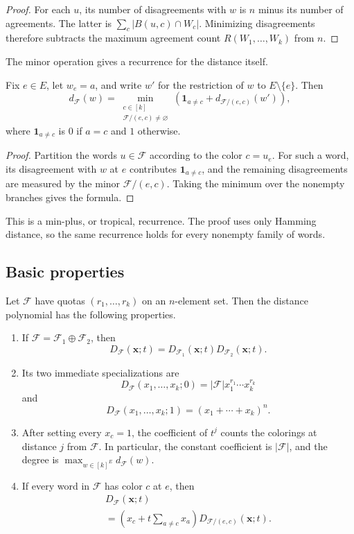 \begin{proof}
For each $u$, its number of disagreements with $w$ is $n$ minus its
number of agreements. The latter is $\sum_c|B(u,c)\cap W_c|$.
Minimizing disagreements therefore subtracts the maximum agreement
count $R(W_1,\dotsc,W_k)$ from $n$.
\end{proof}

The minor operation gives a recurrence for the distance itself.

\begin{proposition}
Fix $e\in E$, let $w_e=a$, and write $w'$ for the restriction of $w$ to
$E\setminus\{e\}$. Then
\[
 d_{\mathcal F}(w)
 =
 \min_{\substack{c\in[k]\\\mathcal F/(e,c)\ne\varnothing}}
 \left(
  \mathbf 1_{a\ne c}+d_{\mathcal F/(e,c)}(w')
 \right),
\]
where $\mathbf 1_{a\ne c}$ is $0$ if $a=c$ and $1$ otherwise.
\end{proposition}

\begin{proof}
Partition the words $u\in\mathcal F$ according to the color $c=u_e$. For
such a word, its disagreement with $w$ at $e$ contributes
$\mathbf 1_{a\ne c}$, and the remaining disagreements are measured by the
minor $\mathcal F/(e,c)$. Taking the minimum over the nonempty branches gives
the formula.
\end{proof}

This is a min-plus, or tropical, recurrence. The proof uses only Hamming
distance, so the same recurrence holds for every nonempty family of words.

\subsection[basicProperties]{Basic properties}

\begin{proposition}
Let $\mathcal F$ have quotas $(r_1,\dotsc,r_k)$ on an $n$-element set.
Then the distance polynomial has the following properties.
\begin{enumerate}
\item If $\mathcal F=\mathcal F_1\oplus\mathcal F_2$, then
\[
 D_{\mathcal F}(\mathbf x;t)
 =D_{\mathcal F_1}(\mathbf x;t)
  D_{\mathcal F_2}(\mathbf x;t).
\]
\item Its two immediate specializations are
\[
 D_{\mathcal F}(x_1,\dotsc,x_k;0)
 =|\mathcal F|x_1^{r_1}\dotsm x_k^{r_k}
\]
and
\[
 D_{\mathcal F}(x_1,\dotsc,x_k;1)
 =(x_1+\dotsb+x_k)^n.
\]
\item After setting every $x_c=1$, the coefficient of $t^j$ counts the
colorings at distance $j$ from $\mathcal F$. In particular, the constant
coefficient is $|\mathcal F|$, and the degree is
$\max_{w\in[k]^E}d_{\mathcal F}(w)$.
\item If every word in $\mathcal F$ has color $c$ at $e$, then
\[
 \begin{gathered}
 D_{\mathcal F}(\mathbf x;t)\\
 =\left(x_c+t\sum_{a\ne c}x_a\right)
  D_{\mathcal F/(e,c)}(\mathbf x;t).
 \end{gathered}
\]
\end{enumerate}
\end{proposition}

